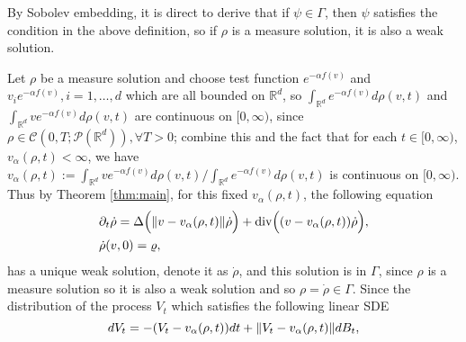 \documentclass[a4paper, 11pt]{article}
\newcommand{\inner}[2]{\left< #1 , #2 \right>}
\theoremstyle{plain}
\theoremstyle{remark}
\theoremstyle{definition}
\renewcommand{\div}{\mathrm{div}}
\newcommand{\intd}{\int_{\mathbb{R}^d}}
\begin{document}
By Sobolev embedding, it is direct to derive that if $\psi\in\Gamma$, then $\psi$ satisfies the condition in the above definition, so if $\rho$ is a measure solution, it is also a weak solution.

	Let $\rho$ be a measure solution and choose test function $e^{-\alpha f(v)}$ and $v_ie^{-\alpha f(v)},i=1,\ldots,d$ which are all bounded on $\mathbb{R}^d$, 
    so $\intd e^{-\alpha f(v)}d\rho(v,t)$ and $\intd ve^{-\alpha f(v)}d\rho(v,t)$ are continuous on $[0,\infty)$, since $\rho\in\mathcal{C}(0,T;\mathcal{P}(\mathbb{R}^d)),\forall T>0$; combine this and the fact that for each $t\in [0,\infty)$, $v_\alpha(\rho,t)<\infty$, we have $v_{\alpha}(\rho,t):=\intd ve^{-\alpha f(v)}d\rho(v,t)/\intd e^{-\alpha f(v)}d\rho(v,t)$ is continuous on $[0,\infty)$. Thus by Theorem \ref{thm:main}, for this fixed $v_{\alpha}(\rho,t)$, the following equation 
    \begin{equation}\label{eq:g127}
		\begin{aligned}
			&\partial_t\dot{\rho}=\Delta\Big(\norm{v-v_\alpha(\rho,t)}\dot{\rho}\Big)+\div\Big((v-v_\alpha(\rho,t))\dot{\rho}\Big),\\
			&\dot{\rho}(v,0)=\varrho,
		\end{aligned}
	\end{equation}
    has a unique weak solution, denote it as $\dot{\rho}$, and this solution is in $\Gamma$, since $\rho$ is a measure solution so it is also a weak solution and so $\rho=\dot{\rho}\in\Gamma$. Since the distribution of the process $V_t$ which satisfies the following linear SDE
	\begin{equation}\label{eq:g126}
		dV_t=-(V_t-v_{\alpha}(\rho,t))dt+\norm{V_t-v_\alpha(\rho,t)}dB_t,
	\end{equation}
\end{document}
